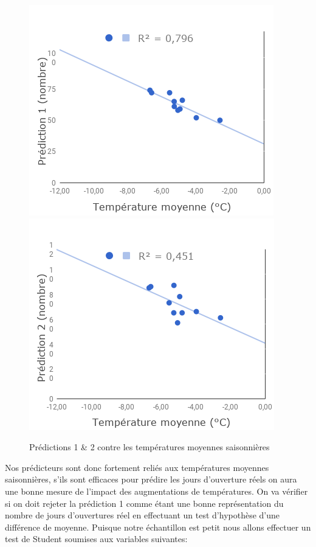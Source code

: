 \documentclass[12pt]{article}
\numberwithin{figure}{section}
\begin{document}
\begin{figure}[h]
    \centering
    \includegraphics[scale=0.5]{Prediction1.png}
    \includegraphics[scale=0.5]{Prediction2.png}
    \caption{Pr\'edictions 1 \& 2 contre les temp\'eratures moyennes saisonni\`eres}
\end{figure}

Nos pr\'edicteurs sont donc fortement reli\'es aux temp\'eratures moyennes saisonni\`eres, s'ils sont
efficaces pour pr\'edire les jours d'ouverture r\'eels on aura une bonne mesure de l'impact des
augmentations de temp\'eratures. On va v\'erifier si on doit rejeter la pr\'ediction 1 comme \'etant
une bonne repr\'esentation du nombre de jours d'ouvertures r\'eel en effectuant un test
d'hypoth\`ese d'une diff\'erence de moyenne. Puisque notre \'echantillon est petit nous allons
effectuer un test de Student soumises aux variables suivantes:
\end{document}

